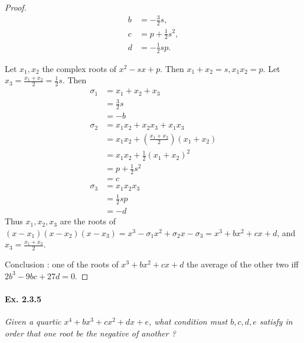 \documentclass[11pt,a4paper]{article}
\begin{document}
\begin{proof}
\begin{align*}
b &= -\frac{3}{2} s,\\
c &= p +\frac{1}{2} s^2,\\
d&=-\frac{1}{2} sp.
\end{align*}

Let $x_1,x_2$ the complex roots of $x^2-sx+p$. Then $x_1+x_2 = s,x_1x_2=p$. Let $x_3 = \frac{x_1+x_2}{2} = \frac{1}{2}s$.
Then
\begin{align*}
\sigma_1 &= x_1+x_2+x_3\\
&= \frac{3}{2} s\\
&=-b\\
\sigma_2 &=x_1x_2+x_2x_3+x_1x_3\\
&=x_1x_2 +\left(\frac{x_1+x_2}{2}\right)(x_1+x_2)\\
&=x_1x_2 + \frac{1}{2}(x_1+x_2)^2\\
&= p +\frac{1}{2} s^2\\
&=c\\
\sigma_3 &= x_1x_2 x_3\\
&=\frac{1}{2}sp\\
&=-d
\end{align*}
Thus $x_1,x_2,x_3$ are the roots of $(x-x_1)(x-x_2)(x-x_3) = x^3 -\sigma_1x^2+\sigma_2x-\sigma_3 = x^3+bx^2+cx+d$, and $x_3 = \frac{x_1+x_2}{2}$.


Conclusion : one of the roots of $x^3+bx^2+cx+d$ the average of the other two iff $2b^3 - 9bc + 27d = 0.$
\end{proof}

\paragraph{Ex. 2.3.5}

{\it Given a quartic $x^4+bx^3+cx^2+dx+e$, what condition must $b,c,d,e$ satisfy in order that one root be the negative of another ?
}
\end{document}
